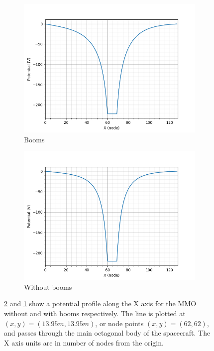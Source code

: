 \begin{center}
    \begin{figure}[H]
      \begin{subfigure}[b]{0.61\textwidth}
      \includegraphics[width=\textwidth]{figures/MMO/noPH/WB/L_noPH_WB.png}
      \caption{Booms}
      \label{fig:L_noPH_WB}
    \end{subfigure}
    \begin{subfigure}[b]{0.61\textwidth}
      \includegraphics[width=\textwidth]{figures/MMO/noPH/NB/L_noPH_NB.png}
      \caption{Without booms}
      \label{fig:L_noPH_NB}
    \end{subfigure}
  \label{fig:Line_noPH}
  \caption{\ref{fig:L_noPH_NB} and \ref{fig:L_noPH_WB} show a potential profile along the X axis for the MMO without and with booms respectively. The line is plotted at $(x,y) = (13.95 m, 13.95 m)$, or node points $(x,y) = (62,62)$, and passes through the main octagonal body of the spacecraft. The X axis units are in number of nodes from the origin.}
  \end{figure}
\end{center}

